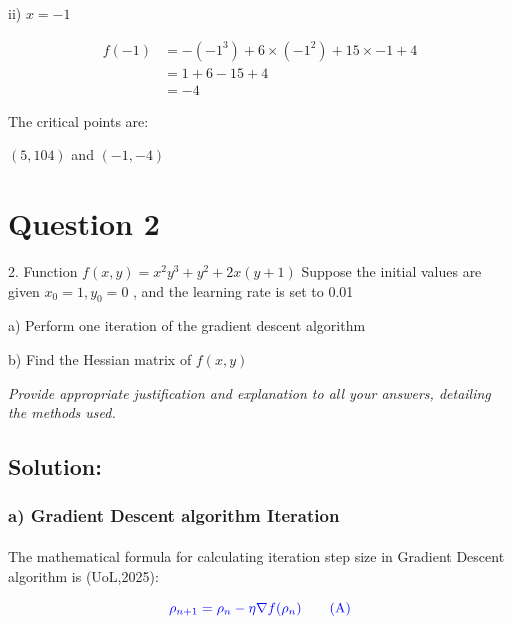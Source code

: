 \documentclass[a4paper]{report}
\begin{document}
ii) $x=-1$

\begin{align*}
    f(-1)&=-(-1^3)+6 \times (-1^2)+15 \times -1+4 \\
        &=1+6-15+4 \\
        &=-4    
\end{align*}


The critical points are:

$(5,104)$ and $(-1,-4)$




\section*{Question 2}

2. Function $f(x,y)=x^2 y^3+y^2+2x(y+1)$  Suppose the initial values are given $x_0=1,y_0=0$ , and the learning rate is set to 0.01 

a) Perform one iteration of the gradient descent algorithm 

b) Find the Hessian matrix of  $f(x,y)$

\textit{Provide appropriate justification and explanation to all your answers, detailing the methods used.}


\subsection*{Solution:}

\subsubsection*{a)  Gradient Descent algorithm Iteration}

\paragraph{}


The mathematical formula for calculating iteration step size in Gradient Descent algorithm is (UoL,2025):

\begin{equation}
    \color{blue} \rho_{n+1} = \rho_n - \eta \nabla f(\rho_n) \tag{A}
\end{equation}
\end{document}
